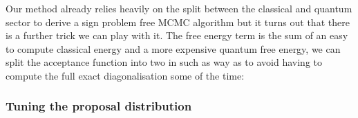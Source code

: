 Our method already relies heavily on the split between the classical and quantum sector to derive a sign problem free MCMC algorithm but it turns out that there is a further trick we can play with it. The free energy term is the sum of an easy to compute classical energy and a more expensive quantum free energy, we can split the acceptance function into two in such as way as to avoid having to compute the full exact diagonalisation some of the time:

\begin{Shaded}
\begin{Highlighting}[]

\OperatorTok{=}

 
\OperatorTok{=}

\OperatorTok{=}
    \OperatorTok{{-}}\OperatorTok{*}\OperatorTok{\textless{}}\NormalTok{,}\NormalTok{):}
\OperatorTok{=}
    
        \OperatorTok{{-}}\OperatorTok{*}\OperatorTok{\textless{}}\NormalTok{,}\NormalTok{):}
\OperatorTok{=}
    
\OperatorTok{=}
    
\end{Highlighting}
\end{Shaded}

\hypertarget{tuning-the-proposal-distribution}{%
\subsubsection{Tuning the proposal distribution}\label{tuning-the-proposal-distribution}}

